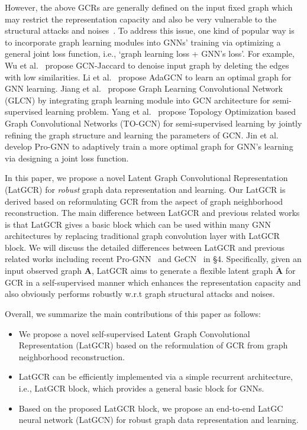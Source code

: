 \documentclass{article}
\begin{document}
However, the above GCRs are generally defined on the input fixed graph which may restrict the representation capacity and also be very vulnerable to the  structural attacks and noises~\cite{mettack,prognn,NEURIPS2020_99e314b1}. To address this issue,
one kind of popular way is
to incorporate graph learning modules into GNNs' training via optimizing a general joint loss function, i.e., `graph learning loss + GNN's loss'.
For example,
Wu et al.~\cite{GCNJaccard} propose  GCN-Jaccard to denoise input graph by deleting the edges with low similarities.
Li et al.~\cite{AdaptiveGCN} propose  AdaGCN to learn an optimal graph for GNN learning.
Jiang et al.~\cite{GLCN} propose Graph Learning Convolutional Network (GLCN) by integrating graph learning module into GCN  architecture for semi-supervised learning problem. 
Yang et al.~\cite{TOGCN}
propose Topology Optimization based Graph Convolutional Networks (TO-GCN) for semi-supervised learning by jointly refining the graph structure and learning the parameters of GCN.
Jin et al.~\cite{prognn} develop Pro-GNN to adaptively train a more optimal graph for GNN's learning via designing a joint loss function.

In this paper, we propose a novel Latent Graph Convolutional Representation (LatGCR) for \emph{robust} graph data representation and learning.
Our LatGCR is derived based on reformulating GCR from the aspect of {graph neighborhood reconstruction}.
The main difference between LatGCR and previous related works is that LatGCR gives a basic block which can be used within many GNN architectures by replacing traditional graph convolution layer with LatGCR block. We will discuss the detailed differences between LatGCR and
previous related works including recent Pro-GNN~\cite{prognn} and GeCN~\cite{GECN} in \S 4.
Specifically, given an input observed graph $\textbf{A}$, LatGCR aims to generate a flexible latent graph $\widetilde{\textbf{A}}$ for GCR in a {self-supervised} manner which enhances the representation capacity and also obviously performs robustly w.r.t graph structural attacks and noises.

Overall, we summarize the main contributions of this paper as follows:
\begin{itemize}
 \item  We propose a novel self-supervised Latent Graph Convolutional Representation (LatGCR) based on the reformulation of GCR from graph neighborhood reconstruction.
 \item LatGCR can be efficiently implemented via a simple recurrent  architecture, i.e., LatGCR block, which provides a general basic block for GNNs.
\item  Based on the proposed LatGCR block,
we propose an end-to-end  LatGC neural network (LatGCN) for robust graph data representation and learning.
\end{itemize}
\end{document}
